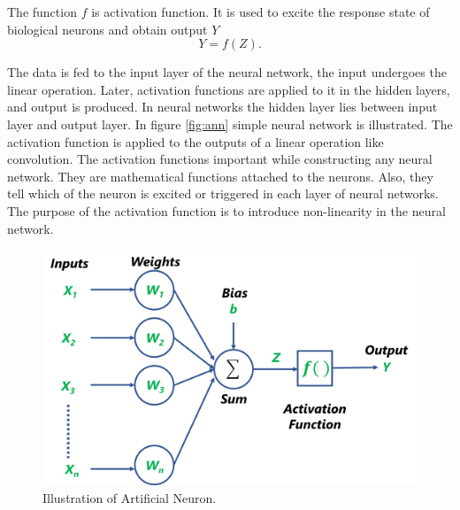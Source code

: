 The function $f$ is activation function. It is used to excite the response state of biological neurons and obtain output $Y$
\begin{equation}\label{artificialNeuron}
Y = f(Z).
\end{equation}


The data is fed to the input layer of the neural network, the input undergoes the linear operation. Later, activation functions are applied to it in the hidden layers, and output is produced. In neural networks the hidden layer lies between input layer and output layer. In figure \ref{fig:ann} simple neural network is illustrated. The activation function is applied to the outputs of a linear operation like convolution. The activation functions important while constructing any neural network. They are mathematical functions attached to the neurons. Also, they tell which of the neuron is excited or triggered in each layer of neural networks. The purpose of the activation function is to introduce non-linearity in the neural network.

\begin{figure}[H]
        \begin{center}
	    \includegraphics[scale=0.30]{images/Fundamentals/artificialNeuron.png}
	    \caption[Illustration of Artificial Neuron.]{Illustration of Artificial Neuron.}
	    \label{fig:artificialNeuron}
	    \end{center}
\end{figure}


